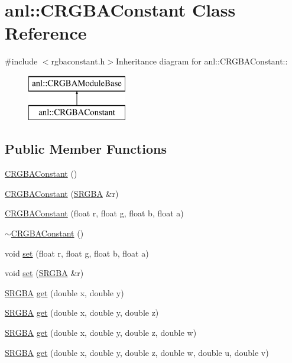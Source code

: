\hypertarget{classanl_1_1CRGBAConstant}{
\section{anl::CRGBAConstant Class Reference}
\label{classanl_1_1CRGBAConstant}
}


{\ttfamily \#include $<$rgbaconstant.h$>$}Inheritance diagram for anl::CRGBAConstant::\begin{figure}[H]
\begin{center}
\leavevmode
\includegraphics[height=2cm]{classanl_1_1CRGBAConstant}
\end{center}
\end{figure}
\subsection*{Public Member Functions}
\begin{DoxyCompactItemize}
\item 
\hyperlink{classanl_1_1CRGBAConstant_ad4b68117c0791773256ecad93d80e711}{CRGBAConstant} ()
\item 
\hyperlink{classanl_1_1CRGBAConstant_a4958c1c726d5e0d2623478d123a142af}{CRGBAConstant} (\hyperlink{structanl_1_1SRGBA}{SRGBA} \&r)
\item 
\hyperlink{classanl_1_1CRGBAConstant_ade5bebec68dd9c5d24cd9f58b16eab3f}{CRGBAConstant} (float r, float g, float b, float a)
\item 
\hyperlink{classanl_1_1CRGBAConstant_aff4be139718c71e0182d8ddad7003a95}{$\sim$CRGBAConstant} ()
\item 
void \hyperlink{classanl_1_1CRGBAConstant_a77b89eb3a59e01b2a72c8eca7e35dc43}{set} (float r, float g, float b, float a)
\item 
void \hyperlink{classanl_1_1CRGBAConstant_a4b565c67f527c909faace9c7d407ff19}{set} (\hyperlink{structanl_1_1SRGBA}{SRGBA} \&r)
\item 
\hyperlink{structanl_1_1SRGBA}{SRGBA} \hyperlink{classanl_1_1CRGBAConstant_a2b2d721d125057ef64b73c8991f9cdf2}{get} (double x, double y)
\item 
\hyperlink{structanl_1_1SRGBA}{SRGBA} \hyperlink{classanl_1_1CRGBAConstant_aba1cf079bf221502fe759880358b2370}{get} (double x, double y, double z)
\item 
\hyperlink{structanl_1_1SRGBA}{SRGBA} \hyperlink{classanl_1_1CRGBAConstant_a198233c5bec1e23e0b786cb340bd3a75}{get} (double x, double y, double z, double w)
\item 
\hyperlink{structanl_1_1SRGBA}{SRGBA} \hyperlink{classanl_1_1CRGBAConstant_ae1d83d837656a78bc42106768d911b83}{get} (double x, double y, double z, double w, double u, double v)
\end{DoxyCompactItemize}
